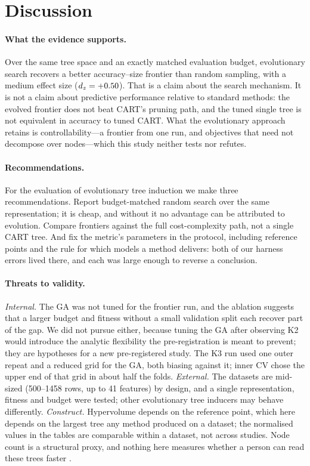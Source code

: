 \documentclass[11pt]{article}
\newcommand{\GA}{GA\xspace}
\begin{document}
\section{Discussion}
\label{sec:discussion}

\paragraph{What the evidence supports.} Over the same tree space and an exactly matched
evaluation budget, evolutionary search recovers a better accuracy--size frontier than
random sampling, with a medium effect size ($d_z=+0.50$). That is a claim about the
search mechanism. It is not a claim about predictive performance relative to standard
methods: the evolved frontier does not beat CART's pruning path, and the tuned single
tree is not equivalent in accuracy to tuned CART. What the evolutionary approach retains
is controllability---a frontier from one run, and objectives that need not decompose over
nodes---which this study neither tests nor refutes.

\paragraph{Recommendations.} For the evaluation of evolutionary tree induction we make
three recommendations. Report budget-matched random search over the same representation;
it is cheap, and without it no advantage can be attributed to evolution. Compare
frontiers against the full cost-complexity path, not a single CART tree. And fix the
metric's parameters in the protocol, including reference points and the rule for which
models a method delivers: both of our harness errors lived there, and each was large
enough to reverse a conclusion.

\paragraph{Threats to validity.}
\emph{Internal.} The \GA was not tuned for the frontier run, and the ablation suggests
that a larger budget and fitness without a small validation split each recover part of
the gap. We did not pursue either, because tuning the \GA after observing K2 would
introduce the analytic flexibility the pre-registration is meant to prevent; they are
hypotheses for a new pre-registered study. The K3 run used one outer repeat and a reduced
grid for the \GA, both biasing against it; inner CV chose the upper end of that grid in
about half the folds.
\emph{External.} The datasets are mid-sized (500--1458 rows, up to 41 features) by design,
and a single representation, fitness and budget were tested; other evolutionary tree
inducers may behave differently.
\emph{Construct.} Hypervolume depends on the reference point, which here depends on the
largest tree any method produced on a dataset; the normalised values in the tables are
comparable within a dataset, not across studies. Node count is a structural proxy, and
nothing here measures whether a person can read these trees faster
\citep{lipton2018,doshivelez2017}.
\end{document}
